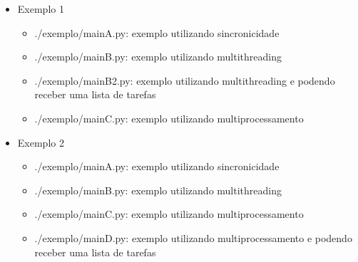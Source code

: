 \documentclass{beamer}
\begin{document}
	\begin{itemize}
		\item Exemplo 1 \\
			\begin{itemize}
				\item ./exemplo/main\textunderscore A.py: exemplo utilizando sincronicidade \\
				\item ./exemplo/main\textunderscore B.py: exemplo utilizando multithreading \\
				\item ./exemplo/main\textunderscore B2.py: exemplo utilizando multithreading e podendo receber uma lista de tarefas \\				
				\item ./exemplo/main\textunderscore C.py: exemplo utilizando multiprocessamento \\
		 	\end{itemize}
		\item Exemplo 2 \\
			\begin{itemize}
				\item ./exemplo/main\textunderscore A.py: exemplo utilizando sincronicidade \\
				\item ./exemplo/main\textunderscore B.py: exemplo utilizando multithreading \\			
				\item ./exemplo/main\textunderscore C.py: exemplo utilizando multiprocessamento \\
				\item ./exemplo/main\textunderscore D.py: exemplo utilizando multiprocessamento e podendo receber uma lista de tarefas \\				
		 	\end{itemize}		 	
 	\end{itemize}
	\newpage
\end{document}
